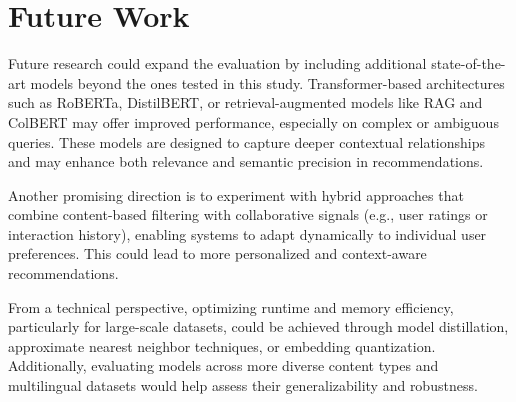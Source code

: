 \documentclass{llncs}
\begin{document}



\section{Future Work}

Future research could expand the evaluation by including additional state-of-the-art models beyond the ones tested in this study. Transformer-based architectures such as RoBERTa, DistilBERT, or retrieval-augmented models like RAG and ColBERT may offer improved performance, especially on complex or ambiguous queries. These models are designed to capture deeper contextual relationships and may enhance both relevance and semantic precision in recommendations.

Another promising direction is to experiment with hybrid approaches that combine content-based filtering with collaborative signals (e.g., user ratings or interaction history), enabling systems to adapt dynamically to individual user preferences. This could lead to more personalized and context-aware recommendations.

From a technical perspective, optimizing runtime and memory efficiency, particularly for large-scale datasets, could be achieved through model distillation, approximate nearest neighbor techniques, or embedding quantization. Additionally, evaluating models across more diverse content types and multilingual datasets would help assess their generalizability and robustness.
\end{document}
